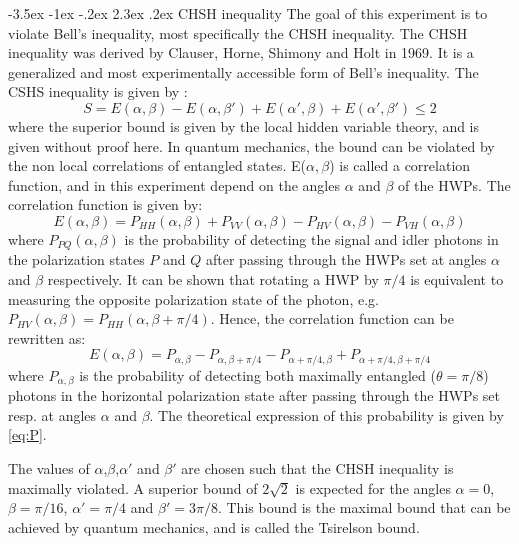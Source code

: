 \documentclass[a4paper, 12pt,oneside]{article}
\makeatletter
\renewcommand{\subsection}{\@startsection {subsection}{1}{\z@}%
             {-3.5ex \@plus -1ex \@minus -.2ex}%
             {2.3ex \@plus.2ex}%
             {\normalfont\normalsize\bfseries}}
\makeatother
\begin{document}
\subsection{CHSH inequality}
The goal of this experiment is to violate Bell's inequality, most specifically the CHSH inequality. The CHSH inequality was derived by Clauser, Horne, Shimony and Holt in 1969. It is a generalized and most experimentally accessible form of Bell's inequality. The CSHS inequality is given by : 
\begin{equation}
    S = E(\alpha,\beta) - E(\alpha,\beta') + E(\alpha',\beta) + E(\alpha',\beta') \leq 2
    \label{CHSH}
\end{equation}
where the superior bound is given by the local hidden variable theory, and is given without proof here. In quantum mechanics, the bound can be violated by the non local correlations of entangled states. E($\alpha,\beta$) is called a correlation function, and in this experiment depend on the angles $\alpha$ and $\beta$ of the HWPs. The correlation function is given by:
\begin{equation}
    E(\alpha,\beta) = P_{HH}(\alpha,\beta) + P_{VV}(\alpha,\beta) - P_{HV}(\alpha,\beta) - P_{VH}(\alpha,\beta)
\end{equation}
where $P_{PQ}(\alpha,\beta)$ is the probability of detecting the signal and idler photons in the polarization states $P$ and $Q$ after passing through the HWPs set at angles $\alpha$ and $\beta$ respectively. It can be shown that rotating a HWP by $\pi/4$ is equivalent to measuring the opposite polarization state of the photon, e.g. $P_{HV}(\alpha,\beta) = P_{HH}(\alpha,\beta + \pi/4)$. Hence, the correlation function can be rewritten as:
\begin{equation}
    E(\alpha,\beta) = P_{\alpha,\beta} - P_{\alpha,\beta + \pi/4} - P_{\alpha+ \pi/4,\beta} + P_{\alpha+ \pi/4,\beta+ \pi/4}
\end{equation}
where $P_{\alpha,\beta}$ is the probability of detecting both maximally entangled ($\theta = \pi/8$) photons in the horizontal polarization state after passing through the HWPs set resp. at angles $\alpha$ and $\beta$. The theoretical expression of this probability is given by \eqref{eq:P}. 

The values of $\alpha$,$\beta$,$\alpha'$ and $\beta'$ are chosen such that the CHSH inequality is maximally violated. A superior bound of $2\sqrt 2$ is expected for the angles $\alpha = 0$, $\beta = \pi/16$, $\alpha' = \pi/4$ and $\beta' = 3\pi/8$. This bound is the maximal bound that can be achieved by quantum mechanics, and is called the Tsirelson bound.
\end{document}
